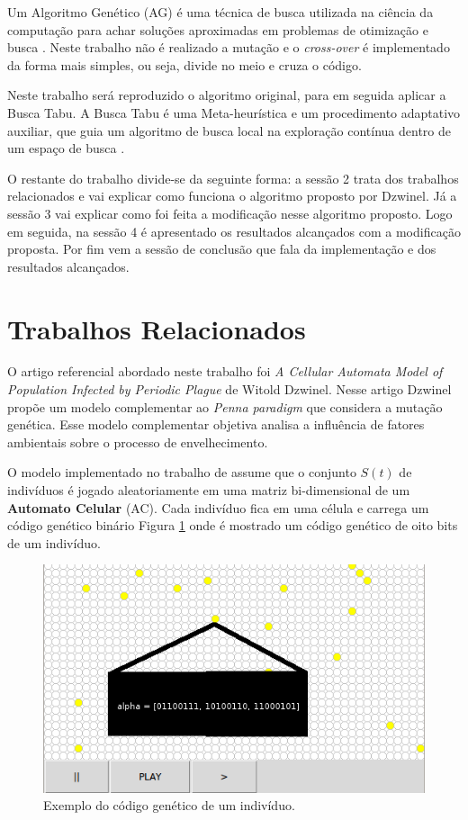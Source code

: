 \documentclass[12pt]{article}
\begin{document}
Um Algoritmo Genético (AG) é uma técnica de busca utilizada na ciência da
computação para achar soluções aproximadas em problemas de otimização e busca 
\cite{wiki:ag}. Neste trabalho não é realizado a mutação e o \textit{cross-over} é implementado da forma mais simples, ou seja, divide no meio e cruza o
código.

Neste trabalho será reproduzido o algoritmo original, para em seguida aplicar
a Busca Tabu. A Busca Tabu é uma Meta-heurística e um procedimento adaptativo
auxiliar, que guia um algoritmo de busca local na exploração contínua dentro
de um espaço de busca \cite{wiki:bt}.

O restante do trabalho divide-se da seguinte forma: a sessão 2 trata dos
trabalhos relacionados e vai explicar como funciona o algoritmo proposto por
Dzwinel. Já a sessão 3 vai explicar como foi feita a modificação nesse
algoritmo proposto. Logo em seguida, na sessão 4 é apresentado os resultados
alcançados com a modificação proposta. Por fim vem a sessão de conclusão que
fala da implementação e dos resultados alcançados.

\section{Trabalhos Relacionados}

O artigo referencial abordado neste trabalho foi \textit{A Cellular Automata 
Model of Population Infected by Periodic Plague} de Witold Dzwinel. Nesse
artigo Dzwinel propõe um modelo complementar ao \textit{Penna paradigm}
\cite{almeida1998theoretical, de1998strategies} que considera a mutação
genética. Esse modelo complementar objetiva analisa a influência de fatores
ambientais sobre o processo de envelhecimento.

O modelo implementado no trabalho de \cite{dzwinel:04} assume que o conjunto
$S(t)$ de indivíduos é jogado aleatoriamente em uma matriz bi-dimensional
de um \textbf{Automato Celular} (AC). Cada indivíduo fica em uma célula e
carrega um código genético binário Figura \ref{fig:codigo-genetico} onde é
mostrado um código genético de oito bits de um indivíduo.

\begin{figure}[ht]
\centering
\includegraphics[width=.3\textwidth]{imagens/codigo-genetico}
\caption{Exemplo do código genético de um indivíduo.}
\label{fig:codigo-genetico}
\end{figure}
\end{document}
